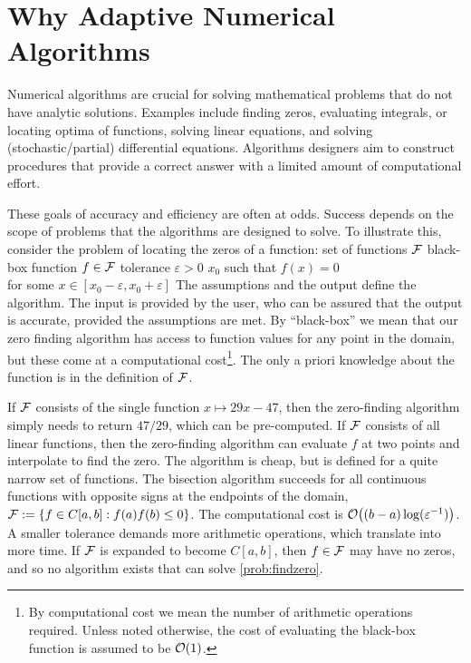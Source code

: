 \chapter{Why Adaptive Numerical Algorithms}
Numerical algorithms are crucial for solving mathematical problems that do not have analytic solutions.  Examples include finding zeros, evaluating integrals, or locating optima of functions, solving linear equations, and solving (stochastic/partial) differential equations.  Algorithms designers aim to construct procedures that provide a correct answer with a limited amount of computational effort.  

These goals of accuracy and efficiency are often at odds.  Success depends on the scope of problems that the algorithms are designed to solve.  To illustrate this, consider the problem of locating the zeros of a function:
%
{set of functions $\mathcal{F}$}%
{black-box function $f \in \mathcal{F}$ \newline tolerance $\varepsilon > 0$ }%
{$x_0$ such that $f(x) = 0$ \\ 
    \qquad for some $x \in [x_0 - \varepsilon, x_0 + \varepsilon]$}
The assumptions and the output define the algorithm.  The input is provided by the user, who can be assured that the output is accurate, provided the assumptions are met.  By ``black-box'' we mean that our zero finding algorithm has access to function values for any point in the domain, but these come at a computational cost\footnote{By computational cost we mean the number of arithmetic operations required.  Unless noted otherwise, the cost of evaluating the black-box function is assumed to be $\operatorname{{\mathcal O}}(1)$.}. The only a priori knowledge about the function is in the definition of $\mathcal{F}$.

If $\mathcal{F}$ consists of the single function $x \mapsto 29x - 47$, then the zero-finding algorithm simply needs to return $47/29$, which can be pre-computed.  If $\mathcal{F}$ consists of all linear functions, then the zero-finding algorithm can evaluate $f$ at two points and interpolate to find the zero.  The algorithm is cheap, but is defined for a quite narrow set of functions.  The bisection algorithm succeeds for all continuous functions  with opposite signs at the endpoints of the domain, $\mathcal{F}: = \{ f \in C[a,b] : f(a)f(b) \le 0\}$.  The computational cost is $\operatorname{{\mathcal O}}\bigl((b-a) \log(\varepsilon^{-1}) \bigr)$. A smaller tolerance demands more arithmetic operations, which translate into more time.  If $\mathcal{F}$ is expanded to become $C[a,b]$, then $f \in \mathcal{F}$ may have no zeros, and so no algorithm exists that can solve \eqref{prob:findzero}.

